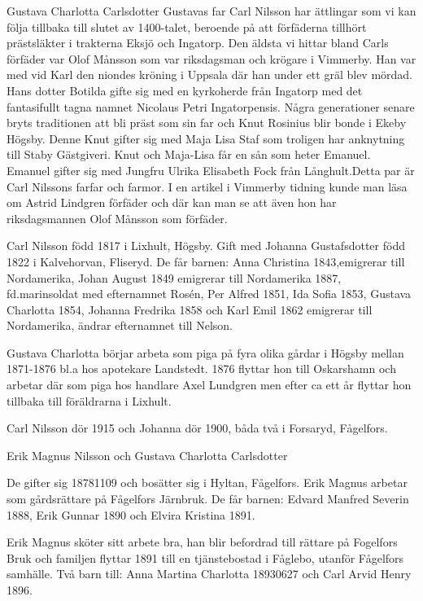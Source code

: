 Gustava Charlotta Carlsdotter
Gustavas far Carl Nilsson har ättlingar som vi kan  följa tillbaka till slutet av 1400-talet, beroende på att förfäderna tillhört prästsläkter i trakterna Eksjö och Ingatorp. Den äldsta vi hittar bland Carls förfäder var Olof Månsson som var riksdagsman och krögare i Vimmerby. Han var med vid Karl den niondes kröning i Uppsala där han under ett gräl blev mördad. Hans dotter Botilda gifte sig med en kyrkoherde från Ingatorp med det fantasifullt tagna namnet Nicolaus Petri Ingatorpensis.
Några generationer senare bryts traditionen att bli präst som sin far och Knut Rosinius blir bonde i Ekeby Högsby. Denne Knut gifter sig med Maja Lisa Staf som troligen har anknytning till Staby Gästgiveri. Knut och Maja-Lisa får en sån som heter Emanuel. Emanuel gifter sig med Jungfru Ulrika Elisabeth Fock från Långhult.Detta par är Carl Nilssons farfar och farmor.
I en artikel i Vimmerby tidning kunde man läsa om Astrid Lindgren förfäder och där kan man se att även hon har riksdagsmannen Olof Månsson som förfäder.


Carl Nilsson född 1817 i Lixhult, Högsby. Gift med Johanna Gustafsdotter född 1822 i Kalvehorvan, Fliseryd.
De får barnen: Anna Christina 1843,emigrerar till Nordamerika, Johan August 1849 emigrerar till Nordamerika 1887, fd.marinsoldat med efternamnet Rosén, Per Alfred 1851, Ida Sofia 1853, Gustava Charlotta 1854, Johanna Fredrika 1858 och Karl Emil 1862 emigrerar till Nordamerika, ändrar efternamnet till Nelson.


Gustava Charlotta börjar arbeta som piga på  fyra olika gårdar i Högsby mellan 1871-1876 bl.a hos apotekare Landstedt. 1876 flyttar hon till Oskarshamn och arbetar där som piga hos handlare Axel Lundgren men efter ca ett år flyttar hon tillbaka till föräldrarna i Lixhult.


Carl Nilsson dör 1915 och Johanna dör 1900, båda två i Forsaryd, Fågelfors.




Erik Magnus Nilsson och Gustava Charlotta Carlsdotter


De gifter sig 18781109 och bosätter sig i Hyltan, Fågelfors. Erik Magnus arbetar som gårdsrättare på Fågelfors Järnbruk. 
De får barnen: Edvard Manfred Severin 1888, Erik Gunnar 1890 och Elvira Kristina 1891.
 
Erik Magnus sköter sitt arbete bra, han blir befordrad till rättare på Fogelfors Bruk och familjen flyttar 1891 till en tjänstebostad i Fåglebo, utanför Fågelfors samhälle.
Två barn till: Anna Martina Charlotta 18930627 och Carl Arvid Henry 1896.


